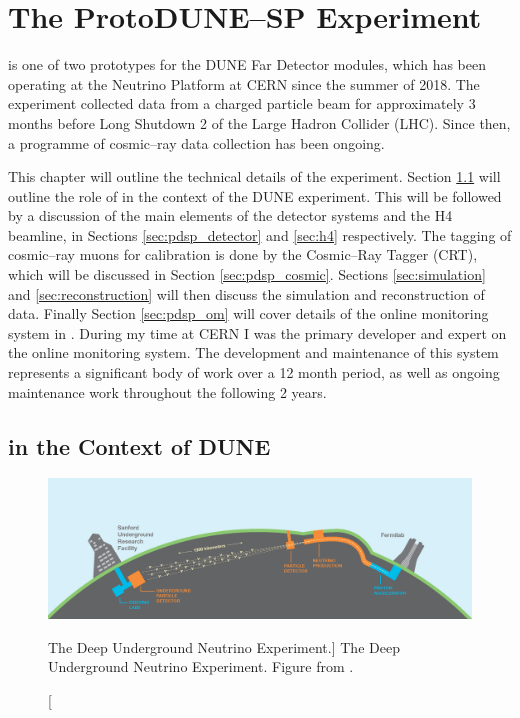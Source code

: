 \chapter{\label{ch:protodune}The ProtoDUNE--SP Experiment} 

\minitoc

\protodune{} is one of two prototypes for the DUNE Far Detector modules, which 
has been operating at the Neutrino Platform at CERN since the summer of 2018. 
The experiment collected data from a charged particle beam for approximately 3 
months before Long Shutdown 2 of the Large Hadron Collider (LHC). Since then, a 
programme of cosmic--ray data collection has been ongoing.

This chapter will outline the technical details of the \protodune{} experiment.
Section \ref{sec:pdsp_dune} will outline the role of \protodune{} in the context
of the DUNE experiment. This will be followed by a discussion of the main
elements of the \protodune{} detector systems and the H4 beamline, in Sections 
\ref{sec:pdsp_detector} and \ref{sec:h4} respectively. The tagging of 
cosmic--ray muons for calibration is done by the Cosmic--Ray Tagger (CRT), 
which will be discussed in Section \ref{sec:pdsp_cosmic}. Sections 
\ref{sec:simulation} and \ref{sec:reconstruction} will then discuss the 
simulation and reconstruction of \protodune{} data. Finally Section 
\ref{sec:pdsp_om} will cover details of the online monitoring system in 
\protodune{}. During my time at CERN I was the primary developer and expert on
the \protodune{} online monitoring system. The development and maintenance of 
this system represents a significant body of work over a 12 month period, as 
well as ongoing maintenance work throughout the following 2 years.

\section{\protodune{} in the Context of DUNE} \label{sec:pdsp_dune}

\begin{figure}

	\centering

	\includegraphics[width=\textwidth]{figures/dune_baseline.png}

	\caption
	[The Deep Underground Neutrino Experiment.]
	{The Deep Underground Neutrino Experiment. Figure from \cite{Abi:2020wmh}.}

	\label{fig:dune_baseline}

\end{figure}


